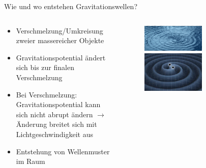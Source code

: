   \begin{frame}{Wie und wo entstehen Gravitationswellen?}
    \begin{columns}
   \begin{column}{0.5\textwidth}
    \begin{itemize}
      \setlength\itemsep{2em}
      \item Verschmelzung/Umkreisung zweier massereicher Objekte
      \item Gravitationspotential ändert sich bis zur finalen Verschmelzung
      \item Bei Verschmelzung: Gravitationspotential kann sich nicht abrupt ändern $\rightarrow$ Änderung breitet sich mit Lichtgeschwindigkeit aus
      \item Entstehung von Wellenmuster im Raum
     \end{itemize}
  \vspace{2em}
  \end{column}
  \begin{column}{0.5\textwidth}
  \begin{figure}
    \centering
    \includegraphics[width=0.6\textwidth]{images/welle.png}\\
    \includegraphics[width=0.6\textwidth]{images/welle2.png}
  \end{figure}
  \end{column}
    \end{columns}
  \end{frame}

